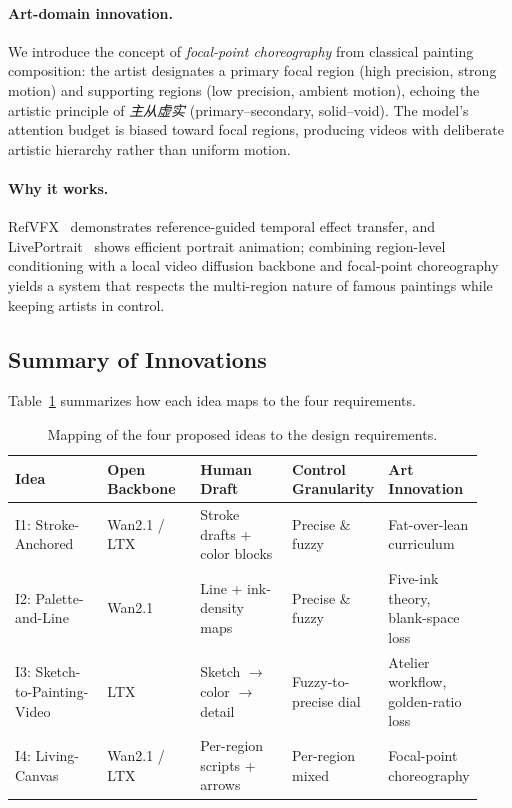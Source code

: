 \paragraph{Art-domain innovation.} We introduce the concept of \emph{focal-point
choreography} from classical painting composition: the artist designates a primary
focal region (high precision, strong motion) and supporting regions (low precision,
ambient motion), echoing the artistic principle of \emph{主从虚实} (primary--secondary,
solid--void). The model's attention budget is biased toward focal regions, producing
videos with deliberate artistic hierarchy rather than uniform motion.

\paragraph{Why it works.} RefVFX~\cite{jones2026refvfx} demonstrates reference-guided
temporal effect transfer, and LivePortrait~\cite{guo2024liveportrait} shows efficient
portrait animation; combining region-level conditioning with a local video diffusion
backbone and focal-point choreography yields a system that respects the multi-region
nature of famous paintings while keeping artists in control.

\subsection{Summary of Innovations}

Table~\ref{tab:ideas} summarizes how each idea maps to the four requirements.

\begin{table}[t]
    \centering
    \small
    \begin{tabular}{p{0.20\linewidth} p{0.20\linewidth} p{0.20\linewidth} p{0.20\linewidth} p{0.13\linewidth}}
        \toprule
        Idea & Open Backbone & Human Draft & Control Granularity & Art Innovation \\
        \midrule
        I1: Stroke-Anchored   & Wan2.1 / LTX & Stroke drafts + color blocks & Precise \& fuzzy & Fat-over-lean curriculum \\
        I2: Palette-and-Line  & Wan2.1       & Line + ink-density maps       & Precise \& fuzzy & Five-ink theory, blank-space loss \\
        I3: Sketch-to-Painting-Video & LTX  & Sketch $\rightarrow$ color $\rightarrow$ detail & Fuzzy-to-precise dial & Atelier workflow, golden-ratio loss \\
        I4: Living-Canvas     & Wan2.1 / LTX & Per-region scripts + arrows   & Per-region mixed & Focal-point choreography \\
        \bottomrule
    \end{tabular}
    \caption{Mapping of the four proposed ideas to the design requirements.}
    \label{tab:ideas}
\end{table}

